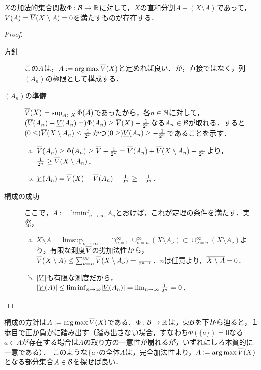\documentclass[uplatex, dvipdfmx]{jsreport}
\begin{document}
\begin{theorem}\label{thm-Hahn-decomposition-theorem}
    $X$の加法的集合関数$\Phi:\mathcal{B}\to\mathbb{R}$に対して，$X$の直和分割$A+(X\setminus A)$であって，$\underline{V}(A)=\overline{V}(X\setminus A)=0$を満たすものが存在する．
\end{theorem}
\begin{proof}\mbox{}
    \begin{description}
        \item[方針] この$A$は，$A:=\operatorname*{arg\,max}\overline{V}(X)$と定めれば良い．が，直接ではなく，列$(A_n)$の極限として構成する．
        \item[$(A_n)$の準備] $\overline{V}(X)=\sup_{A\subset X}\Phi(A)$であったから，各$n\in\mathbb{N}$に対して，$(\overline{V}(A_n)+\underline{V}(A_n)=)\Phi(A_n)\ge\overline{V}(X)-\frac{1}{2^n}$なる$A_n\in\mathcal{B}$が取れる．すると$(0\le)\overline{V}(X\setminus A_n)\le\frac{1}{2^n}$かつ$(0\ge)\underline{V}(A_n)\ge-\frac{1}{2^n}$であることを示す．
        \begin{enumerate}[(a)]
            \item $\overline{V}(A_n)\ge\Phi(A_n)\ge\overline{V}-\frac{1}{2^n}=\overline{V}(A_n)+\overline{V}(X\setminus A_n)-\frac{1}{2^n}$より，$\frac{1}{2^n}\ge\overline{V}(X\setminus A_n)$．
            \item $\underline{V}(A_n)=\overline{V}(X)-\overline{V}(A_n)-\frac{1}{2^n}\ge-\frac{1}{2^n}$．
        \end{enumerate}
        \item[構成の成功] ここで，$A:=\liminf_{n\to\infty}A_n$とおけば，これが定理の条件を満たす．実際，
        \begin{enumerate}[(a)]
            \item $X\setminus A=\limsup_{\nu\to\infty}=\cap^\infty_{n=1}\cup_{\nu=n}^\infty (X\setminus A_\nu)\subset\cup^\infty_{\nu=n}(X\setminus A_\nu)$より，有限な測度$\overline{V}$の劣加法性から，$\overline{V}(X\setminus A)\le\sum^\infty_{\nu=n}\overline{V}(X\setminus A_\nu)=\frac{1}{2^{n-1}}$．$n$は任意より，$\overline{X\setminus A}=0$．
            \item $\lvert\underline{V}\rvert$も有限な測度だから，$\lvert\underline{V}(A)\rvert\le\liminf_{n\to\infty}\lvert\underline{V}(A_n)\rvert=\lim_{n\to\infty}\frac{1}{2^n}=0$．
        \end{enumerate}
    \end{description}
\end{proof}
\begin{remarks}
    構成の方針は$A:=\operatorname*{arg\,max}\overline{V}(X)$である．$\Phi:\mathcal{B}\to\mathbb{R}$は，束$\mathcal{B}$を下から辿ると，１歩目で正か負かに踏み出す（踏み出さない場合，すなわち$\Phi(\{a\})=0$なる$a\in A$が存在する場合は$A$の取り方の一意性が崩れるが，いずれにしろ本質的に一意である）．
    このような$\{a\}$の全体$A$は，完全加法性より，$A:=\operatorname*{arg\,max}\overline{V}(X)$となる部分集合$A\in\mathcal{B}$を探せば良い．
\end{remarks}
\end{document}
